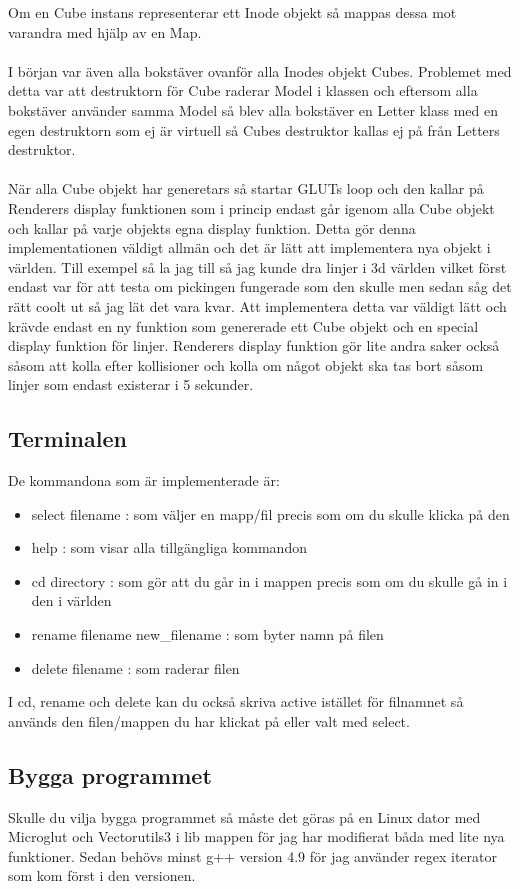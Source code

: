 Om en Cube instans representerar ett Inode objekt så mappas dessa mot varandra med hjälp av en Map.
\\
\\
I början var även alla bokstäver ovanför alla Inodes objekt Cubes. Problemet med detta var att destruktorn för Cube raderar Model i klassen och eftersom alla bokstäver använder samma Model så blev alla bokstäver en Letter klass med en egen destruktorn som ej är virtuell så Cubes destruktor kallas ej på från Letters destruktor.
\\
\\
När alla Cube objekt har generetars så startar GLUTs loop och den kallar på Renderers display funktionen som i princip endast går igenom alla Cube objekt och kallar på varje objekts egna display funktion. Detta gör denna implementationen väldigt allmän och det är lätt att implementera nya objekt i världen. Till exempel så la jag till så jag kunde dra linjer i 3d världen vilket först endast var för att testa om pickingen fungerade som den skulle men sedan såg det rätt coolt ut så jag lät det vara kvar. Att implementera detta var väldigt lätt och krävde endast en ny funktion som genererade ett Cube objekt och en special display funktion för linjer. Renderers display funktion gör lite andra saker också såsom att kolla efter kollisioner och kolla om något objekt ska tas bort såsom linjer som endast existerar i 5 sekunder.

\subsection{Terminalen}
De kommandona som är implementerade är:
\begin{itemize}
\item select filename : som väljer en mapp/fil precis som om du skulle klicka på den 
\item help : som visar alla tillgängliga kommandon
\item cd directory : som gör att du går in i mappen precis som om du skulle gå in i den i världen
\item  rename filename new\_filename : som byter namn på filen
\item delete filename : som raderar filen
\end{itemize}
I cd, rename och delete kan du också skriva active istället för filnamnet så används den filen/mappen du har klickat på eller valt med select.

\subsection{Bygga programmet}
Skulle du vilja bygga programmet så måste det göras på en Linux dator med Microglut och Vectorutils3 i lib mappen för jag har modifierat båda med lite nya funktioner. Sedan behövs minst g++ version 4.9 för jag använder regex iterator som kom först i den versionen.